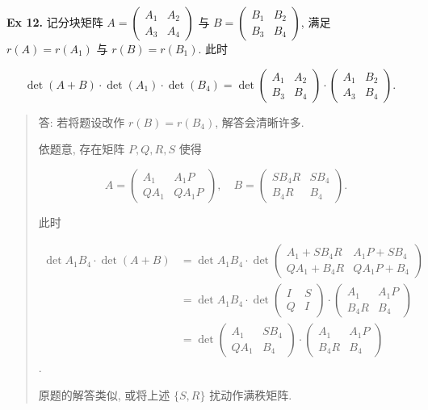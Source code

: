 \documentclass[
]{ctexart}
\begin{document}
\textbf{Ex 12.} 记分块矩阵
\(A=\begin{pmatrix}A_1&A_2\\A_3&A_4\end{pmatrix}\) 与
\(B=\begin{pmatrix}B_1&B_2\\B_3&B_4\end{pmatrix}\), 满足 \(r(A)=r(A_1)\)
与 \(r(B)=r(B_1)\). 此时

\[\det (A+B) \cdot \det (A_1)\cdot \det (B_4)=\det \begin{pmatrix}A_1&A_2\\B_3&B_4\end{pmatrix}\cdot \begin{pmatrix}A_1&B_2\\A_3&B_4\end{pmatrix}.\]

\begin{quote}
答: 若将题设改作 \(r(B)=r(B_4)\), 解答会清晰许多.

依题意, 存在矩阵 \(P,Q,R,S\) 使得

\[A=\begin{pmatrix}A_1&A_1P\\QA_1&QA_1P\end{pmatrix},\quad B=\begin{pmatrix}SB_4R&SB_4\\B_4R&B_4\end{pmatrix}.\]

此时

\begin{align*}
\det A_1 B_4\cdot \det (A+B)&=\det A_1B_4\cdot \det \begin{pmatrix}A_1+SB_4R&A_1P+SB_4\\QA_1+B_4R&QA_1P+B_4\end{pmatrix}\\[6pt]
&=\det A_1B_4\cdot  \det \begin{pmatrix}I&S\\Q&I\end{pmatrix}\cdot \begin{pmatrix}A_1&A_1P\\B_4R&B_4\end{pmatrix}\\[6pt]
&=\det \begin{pmatrix}A_1&SB_4\\QA_1&B_4\end{pmatrix}\cdot \begin{pmatrix}A_1&A_1P\\B_4R&B_4\end{pmatrix}
\end{align*}.

原题的解答类似, 或将上述 \(\{S,R\}\) 扰动作满秩矩阵.
\end{quote}
\end{document}
